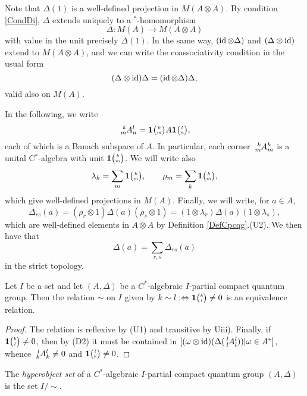 Note that $\Delta(1)$ is a well-defined projection in $M(A\otimes A)$. By condition \eqref{CondDi}, $\Delta$ extends uniquely to a $^*$-homomorphism \[\Delta: M(A)\rightarrow M(A\otimes A)\] with value in the unit precisely $\Delta(1)$. In the same way, $(\operatorname{id}\otimes \Delta)$ and $(\Delta\otimes \operatorname{id})$ extend to $M(A\otimes A)$, and we can write the coassociativity condition in the usual form \[(\Delta\otimes \operatorname{id})\Delta = (\operatorname{id}\otimes \Delta)\Delta,\] valid also on $M(A)$.

In the following, we write \[\Gr{A}{k}{l}{m}{n} = \UnitC{k}{m}A\UnitC{l}{n},\] each of which is a Banach subspace of $A$. In particular, each corner $\Gr{A}{k}{k}{m}{m}$ is a unital C$^*$-algebra with unit $\mathbf{1}{\tiny {\begin{pmatrix} k\\m\end{pmatrix}}}$. We will write also \[\lambda_k = \sum_{m}\mathbf{1}{\tiny {\begin{pmatrix} k\\m\end{pmatrix}}},\qquad \rho_m = \sum_{k}\mathbf{1}{\tiny {\begin{pmatrix} k\\m\end{pmatrix}}},\] which give well-defined projections in $M(A)$. Finally, we will write, for $a\in A$, \[\Delta_{rs}(a) = (\rho_r\otimes 1)\Delta(a)(\rho_s\otimes 1) = (1\otimes \lambda_r)\Delta(a)(1\otimes \lambda_s),\] which are well-defined elements in $A\otimes A$ by Definition \ref{DefCpcqg}.(U2). We then have that  \[\Delta(a) = \sum_{r,s} \Delta_{rs}(a)\] in the strict topology. 

\begin{Lem}
Let $I$ be a set and let $(A,\Delta)$   be a $C^{*}$-algebraic $I$-partial compact quantum group. Then the relation $\sim$ on $I$ given by $k\sim l :\Leftrightarrow \mathbf{1}{\tiny {\begin{pmatrix} k\\l\end{pmatrix}}}\neq 0$ is an equivalence relation.
\end{Lem}
\begin{proof}
  The relation is reflexive by (U1) and transitive by Uiii). Finally, if $\mathbf{1}{\tiny {\begin{pmatrix} k\\l\end{pmatrix}}}\neq 0$, then by (D2) it must be contained in $[(\omega \otimes \id)(\Delta(\Gr{A}{l}{l}{l}{l})) | \omega \in A^{*}]$, whence $\Gr{A}{l}{l}{k}{k}\neq 0$ and $\mathbf{1}{\tiny {\begin{pmatrix} l\\k\end{pmatrix}}} \neq 0$.
\end{proof}
\begin{Def}
  The \emph{hyperobject set} of a   $C^{*}$-algebraic $I$-partial compact quantum group $(A,\Delta)$ is the set $I/\sim$.
\end{Def}

